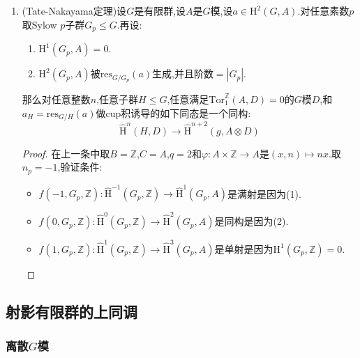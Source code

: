 \begin{enumerate}
\begin{proof}
		再设$q\ge1$,假设$q-1$的时候成立.把$A$嵌入到$\overline{A}=\mathrm{Ind}^G(A)$,记$A_1=\overline{A}/A$.类似定义$C_1=\overline{C}/C$.取$\varphi_1:A_1\times B\to C_1$.那么$a\in\widehat{\mathrm{H}}^q(G,A)$可以表示为$a=\delta(a_1)$,其中$a_1\in\widehat{\mathrm{H}}^{q-1}(G,A_1)$.那么这个$a_1$定义了同构:
		$$f_1(n,H,D)=\widehat{\mathrm{H}}^n(H,B\otimes D)\to\widehat{\mathrm{H}}^{n+q-1}(H,C_1\otimes D)$$
		把它复合上如下同构:
		$$\delta:\widehat{\mathrm{H}}^{n+q-1}(H,C_1\otimes D)\to\widehat{\mathrm{H}}^{n+q}(H,C\otimes D)$$
		就是$f(n,H,D)$,所以这是同构.
	\end{proof}
	\item (Tate-Nakayama定理)设$G$是有限群,设$A$是$G$模,设$a\in\mathrm{H}^2(G,A)$.对任意素数$p$取Sylow $p$子群$G_p\le G$.再设:
	\begin{enumerate}[(1)]
		\item $\mathrm{H}^1(G_p,A)=0$.
		\item $\mathrm{H}^2(G_p,A)$被$\mathrm{res}_{G/G_p}(a)$生成,并且阶数$=|G_p|$.
	\end{enumerate}
	那么对任意整数$n$,任意子群$H\le G$,任意满足$\mathrm{Tor}^{\mathbb{Z}}_1(A,D)=0$的$G$模$D$,和$a_H=\mathrm{res}_{G/H}(a)$做cup积诱导的如下同态是一个同构:
	$$\widehat{\mathrm{H}}^n(H,D)\to\widehat{\mathrm{H}}^{n+2}(g,A\otimes D)$$
	\begin{proof}
		
		在上一条中取$B=\mathbb{Z}$,$C=A$,$q=2$和$\varphi:A\times\mathbb{Z}\to A$是$(x,n)\mapsto nx$.取$n_p=-1$,验证条件:
		\begin{itemize}
			\item $f(-1,G_p,\mathbb{Z}):\widehat{\mathrm{H}}^{-1}(G_p,\mathbb{Z})\to\widehat{\mathrm{H}}^1(G_p,A)$是满射是因为(1).
			\item $f(0,G_p,\mathbb{Z}):\widehat{\mathrm{H}}^0(G_p,\mathbb{Z})\to\widehat{\mathrm{H}}^2(G_p,A)$是同构是因为(2).
			\item $f(1,G_p,\mathbb{Z}):\widehat{\mathrm{H}}^1(G_p,\mathbb{Z})\to\widehat{\mathrm{H}}^3(G_p,A)$是单射是因为$\mathrm{H}^1(G_p,\mathbb{Z})=0$.
		\end{itemize}
	\end{proof}
\end{enumerate}

\newpage
\subsection{射影有限群的上同调}
\subsubsection{离散$G$模}

